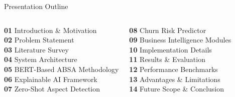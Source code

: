 \documentclass[aspectratio=169]{beamer}
\begin{document}
\begin{frame}{Presentation Outline}
  \begin{columns}[T]
      \begin{tcolorbox}[colback=navyblue!8, colframe=navyblue, arc=5pt,
                        title={\faList\ Core Chapters},
                        fonttitle=\bfseries\small\color{white}, colbacktitle=navyblue]
        \small
        \textcolor{accentblue}{\textbf{01}} Introduction \& Motivation\\[3pt]
        \textcolor{accentblue}{\textbf{02}} Problem Statement\\[3pt]
        \textcolor{accentblue}{\textbf{03}} Literature Survey\\[3pt]
        \textcolor{accentblue}{\textbf{04}} System Architecture\\[3pt]
        \textcolor{accentblue}{\textbf{05}} BERT-Based ABSA Methodology\\[3pt]
        \textcolor{accentblue}{\textbf{06}} Explainable AI Framework\\[3pt]
        \textcolor{accentblue}{\textbf{07}} Zero-Shot Aspect Detection
      \end{tcolorbox}
      \begin{tcolorbox}[colback=navyblue!8, colframe=navyblue, arc=5pt,
                        title={\faCogs\ System Modules},
                        fonttitle=\bfseries\small\color{white}, colbacktitle=navyblue]
        \small
        \textcolor{accentblue}{\textbf{08}} Churn Risk Predictor\\[3pt]
        \textcolor{accentblue}{\textbf{09}} Business Intelligence Modules\\[3pt]
        \textcolor{accentblue}{\textbf{10}} Implementation Details\\[3pt]
        \textcolor{accentblue}{\textbf{11}} Results \& Evaluation\\[3pt]
        \textcolor{accentblue}{\textbf{12}} Performance Benchmarks\\[3pt]
        \textcolor{accentblue}{\textbf{13}} Advantages \& Limitations\\[3pt]
        \textcolor{accentblue}{\textbf{14}} Future Scope \& Conclusion
      \end{tcolorbox}
  \end{columns}
  \vspace{0.3cm}
  \begin{center}
  \end{center}
\end{frame}
\end{document}
